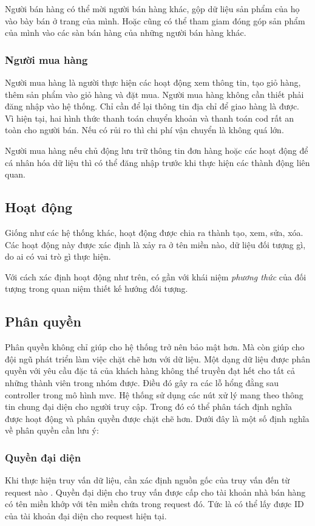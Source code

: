 Người bán hàng có thể mời người bán hàng khác, gộp dữ liệu sản phẩm của họ vào bày bán ở trang của mình. Hoặc cũng có thể tham giam đóng góp sản phẩm của mình vào các sàn bán hàng của những người bán hàng khác.

\subsubsection{Người mua hàng}
Người mua hàng là người thực hiện các hoạt động xem thông tin, tạo giỏ hàng, thêm sản phẩm vào giỏ hàng và đặt mua. Người mua hàng không cần thiết phải đăng nhập vào hệ thống. Chỉ cần để lại thông tin địa chỉ để giao hàng là được. Vì hiện tại, hai hình thức thanh toán chuyển khoản và thanh toán \acrshort{cod} rất an toàn cho người bán. Nếu có rủi ro thì chi phí vận chuyển là không quá lớn.

Người mua hàng nếu chủ động lưu trữ thông tin đơn hàng hoặc các hoạt động để cá nhân hóa dữ liệu thì có thể đăng nhập trước khi thực hiện các thành động liên quan.

\subsection{Hoạt động}
Giống như các hệ thống khác, hoạt động được chia ra thành tạo, xem, sửa, xóa. Các hoạt động này được xác định là xảy ra ở tên miền nào, dữ liệu đối tượng gì, do ai có vai trò gì thực hiện.

Với cách xác định hoạt động như trên, có gần với khái niệm \emph{phương thức} của đối tượng trong quan niệm thiết kế hướng đối tượng.

\subsection{Phân quyền}

Phân quyền không chỉ giúp cho hệ thống trở nên bảo mật hơn. Mà còn giúp cho đội ngũ phát triển làm việc chặt chẽ hơn với dữ liệu. Một dạng dữ liệu được phân quyền với yêu cầu đặc tả của khách hàng không thể truyền đạt hết cho tất cả những thành viên trong nhóm được. Điều đó gây ra các lỗ hổng đằng sau \gls{controller} trong mô hình \acrshort{mvc}. Hệ thống sử dụng các nút xử lý mang theo thông tin chung đại diện cho người truy cập. Trong đó có thể phân tách định nghĩa được hoạt động và phân quyền được chặt chẽ hơn. Dưới đây là một số định nghĩa về phân quyền cần lưu ý:

\subsubsection{Quyền đại diện}\label{what-is-owner}
Khi thực hiện truy vấn dữ liệu, cần xác định nguồn gốc của truy vấn đến từ \gls{request} nào \cite{http}. Quyền đại diện cho truy vấn được cấp cho tài khoản nhà bán hàng có tên miền khớp với tên miền chứa trong \gls{request} đó. Tức là có thể lấy được ID của tài khoản đại diện cho \gls{request} hiện tại. 

